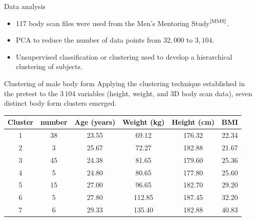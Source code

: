 \documentclass[10pt]{beamer}
\newcommand{\bib}[1]{$^\text{\cite{#1}}$}
\begin{document}
\begin{frame}
	\begin{block}{Data analysis}
		\begin{itemize}
			\item 117 body scan files were used from the Men’s Mentoring Study\bib{MMS}.
			\item PCA to reduce the number of data points from $32,000$ to $3,104$.
			\item Unsupervised classification or clustering used to develop a hierarchical clustering of subjects.
		\end{itemize}
	\end{block}
	\begin{exampleblock}{Clustering of male body form}
		Applying the clustering technique established in the pretest to the $3\,104$ variables (height, weight, and 3D body scan data), seven distinct body form clusters emerged.

		\begin{center}
			{\scriptsize
				\begin{tabular}{cccccc}
					\hline
					Cluster & number & Age (years) & Weight (kg) & Height (cm) & BMI   \\
					\hline
					1       & 38     & 23.55       & 69.12       & 176.32      & 22.34 \\
					2       & 3      & 25.67       & 72.27       & 182.88      & 21.67 \\
					3       & 45     & 24.38       & 81.65       & 179.60      & 25.36 \\
					4       & 5      & 24.80       & 80.65       & 177.80      & 25.60 \\
					5       & 15     & 27.00       & 96.65       & 182.70      & 29.20 \\
					6       & 5      & 27.80       & 112.85      & 187.45      & 32.20 \\
					7       & 6      & 29.33       & 135.40      & 182.88      & 40.83 \\
					\hline
				\end{tabular}}
		\end{center}
	\end{exampleblock}
\end{frame}
\end{document}
